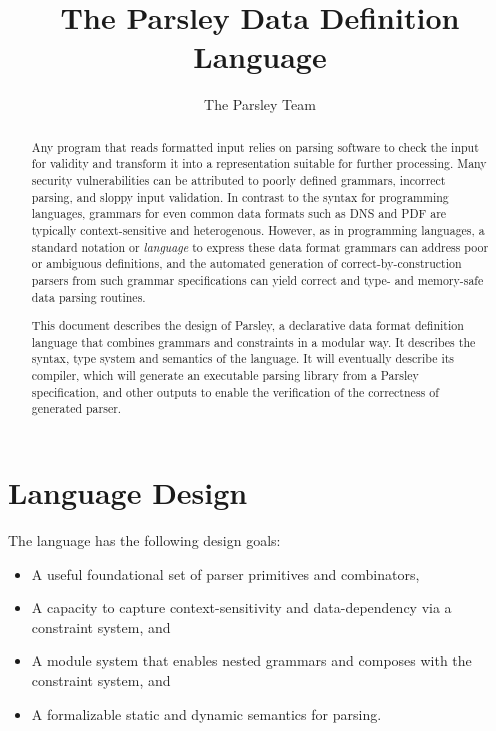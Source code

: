 \documentclass[letterpaper]{article}
\title{The Parsley Data Definition Language}
\author{The Parsley Team}
\begin{document}
\maketitle

\begin{abstract}
  Any program that reads formatted input relies on parsing software to
  check the input for validity and transform it into a representation
  suitable for further processing.  Many security vulnerabilities can
  be attributed to poorly defined grammars, incorrect parsing, and
  sloppy input validation.  In contrast to the syntax for programming
  languages, grammars for even common data formats such as DNS and PDF
  are typically context-sensitive and heterogenous.  However, as in
  programming languages, a standard notation or {\em language} to
  express these data format grammars can address poor or ambiguous
  definitions, and the automated generation of correct-by-construction
  parsers from such grammar specifications can yield correct and type-
  and memory-safe data parsing routines.

  This document describes the design of Parsley, a declarative data
  format definition language that combines grammars and constraints in
  a modular way.  It describes the syntax, type system and semantics
  of the language.  It will eventually describe its compiler, which
  will generate an executable parsing library from a Parsley
  specification, and other outputs to enable the verification of the
  correctness of generated parser.
\end{abstract}

\section{Language Design}
\label{s:design}

The language has the following design goals:

\begin{itemize}
\item A useful foundational set of parser primitives and combinators,
\item A capacity to capture context-sensitivity and data-dependency
  via a constraint system, and
\item A module system that enables nested grammars and composes with
  the constraint system, and
\item A formalizable static and dynamic semantics for parsing.
\end{itemize}
\end{document}
